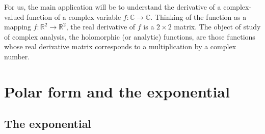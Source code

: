 \documentclass[12pt,openany]{book}
\newcommand{\C}{{\mathbb{C}}}
\newcommand{\R}{{\mathbb{R}}}
\theoremstyle{plain}
\theoremstyle{remark}
\theoremstyle{definition}
\theoremstyle{exercise}
\theoremstyle{example}
\begin{document}
For us, the main application will be to understand the derivative of a
complex-valued function of a complex variable $f \colon \C \to \C$.
Thinking of the function as a mapping $f \colon \R^2 \to \R^2$,
the real derivative of $f$ is a $2 \times 2$ matrix.  The
object of study of complex analysis, the holomorphic (or analytic)
functions, are those functions whose real derivative matrix corresponds to a
multiplication by a complex number.


\section{Polar form and the exponential}

\subsection{The exponential}
\end{document}
